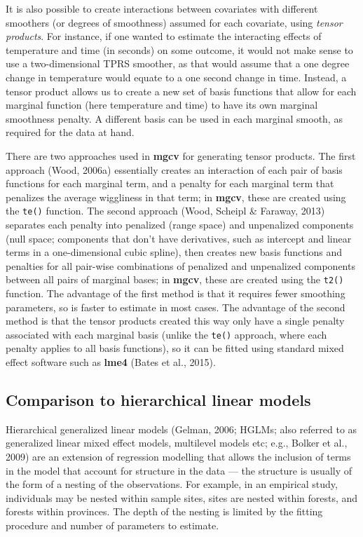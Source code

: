 \documentclass[12pt]{article}
\begin{document}
It is also possible to create interactions between covariates with
different smoothers (or degrees of smoothness) assumed for each
covariate, using \emph{tensor products}. For instance, if one wanted to
estimate the interacting effects of temperature and time (in seconds) on
some outcome, it would not make sense to use a two-dimensional TPRS
smoother, as that would assume that a one degree change in temperature
would equate to a one second change in time. Instead, a tensor product
allows us to create a new set of basis functions that allow for each
marginal function (here temperature and time) to have its own marginal
smoothness penalty. A different basis can be used in each marginal
smooth, as required for the data at hand.

There are two approaches used in \textbf{mgcv} for generating tensor
products. The first approach (Wood, 2006a) essentially creates an
interaction of each pair of basis functions for each marginal term, and
a penalty for each marginal term that penalizes the average wiggliness
in that term; in \textbf{mgcv}, these are created using the
\texttt{te()} function. The second approach (Wood, Scheipl \& Faraway,
2013) separates each penalty into penalized (range space) and
unpenalized components (null space; components that don't have
derivatives, such as intercept and linear terms in a one-dimensional
cubic spline), then creates new basis functions and penalties for all
pair-wise combinations of penalized and unpenalized components between
all pairs of marginal bases; in \textbf{mgcv}, these are created using
the \texttt{t2()} function. The advantage of the first method is that it
requires fewer smoothing parameters, so is faster to estimate in most
cases. The advantage of the second method is that the tensor products
created this way only have a single penalty associated with each
marginal basis (unlike the \texttt{te()} approach, where each penalty
applies to all basis functions), so it can be fitted using standard
mixed effect software such as \textbf{lme4} (Bates et al., 2015).

\subsection{Comparison to hierarchical linear
models}\label{comparison-to-hierarchical-linear-models}

Hierarchical generalized linear models (Gelman, 2006; HGLMs; also
referred to as generalized linear mixed effect models, multilevel models
etc; e.g., Bolker et al., 2009) are an extension of regression modelling
that allows the inclusion of terms in the model that account for
structure in the data --- the structure is usually of the form of a
nesting of the observations. For example, in an empirical study,
individuals may be nested within sample sites, sites are nested within
forests, and forests within provinces. The depth of the nesting is
limited by the fitting procedure and number of parameters to estimate.
\end{document}
